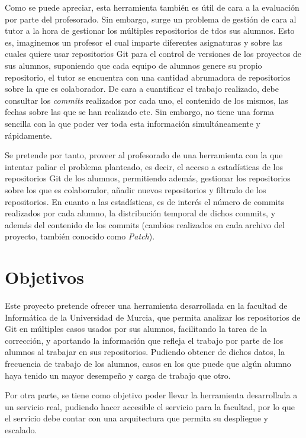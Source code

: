 Como se puede apreciar, esta herramienta también es útil de cara a la
evaluación por parte del profesorado. Sin embargo, surge un problema de
gestión de cara al tutor a la hora de gestionar los múltiples repositorios
de tdos sus alumnos. Esto es, imaginemos un profesor el cual imparte
diferentes asignaturas y sobre las cuales quiere usar repositorios Git para
el control de versiones de los proyectos de sus alumnos, suponiendo que
cada equipo de alumnos genere su propio repositorio, el tutor se encuentra
con una cantidad abrumadora de repositorios sobre la que es colaborador. De
cara a cuantificar el trabajo realizado, debe consultar los \emph{commits}
realizados por cada uno, el contenido de los mismos, las fechas sobre las
que se han realizado etc. Sin embargo, no tiene una forma sencilla con la
que poder ver toda esta información simultáneamente y rápidamente.

Se pretende por tanto, proveer al profesorado de una herramienta con la que
intentar paliar el problema planteado, es decir, el acceso a estadísticas
de los repositorios Git de los alumnos, permitiendo además, gestionar los
repositorios sobre los que es colaborador, añadir nuevos repositorios y
filtrado de los repositorios. En cuanto a las estadísticas, es de interés
el número de commits realizados por cada alumno, la distribución temporal
de dichos commits, y además del contenido de los commits (cambios
realizados en cada archivo del proyecto, también conocido como
\textit{Patch}).

\section{Objetivos}


Este proyecto pretende ofrecer una herramienta desarrollada en la facultad de Informática de la Universidad de Murcia, que permita analizar los repositorios de Git en múltiples casos usados por sus alumnos, facilitando la tarea de la corrección, y aportando la información que refleja el trabajo por parte de los alumnos al trabajar en sus repositorios. Pudiendo obtener de dichos datos, la frecuencia de trabajo de los alumnos, casos en los que puede que algún alumno haya tenido un mayor desempeño y carga de trabajo que otro.

Por otra parte, se tiene como objetivo poder llevar la herramienta desarrollada a un servicio real, pudiendo hacer accesible el servicio para la facultad, por lo que el servicio debe contar con una arquitectura que permita su despliegue y escalado.

